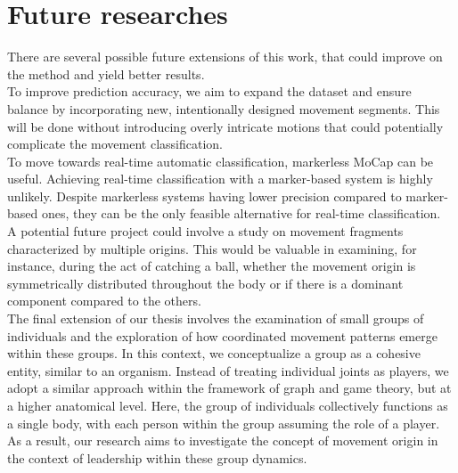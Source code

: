 \section{Future researches}
\label{sec:future_researches}
There are several possible future extensions of this work, that could improve on the method
and yield better results. \\

To improve prediction accuracy, we aim to expand the dataset and ensure balance by incorporating new, intentionally designed movement segments.
This will be done without introducing overly intricate motions that could potentially complicate the movement classification.
\\
To move towards real-time automatic classification, markerless MoCap can be useful.
Achieving real-time classification with a marker-based system is highly unlikely.
Despite markerless systems having lower precision compared to marker-based ones, they can be the only feasible alternative for real-time classification.
\\
A potential future project could involve a study on movement fragments characterized by multiple origins.
This would be valuable in examining, for instance, during the act of catching a ball, whether the movement origin is symmetrically distributed throughout the body or if there is a dominant component compared to the others.
\\
The final extension of our thesis involves the examination of small groups of individuals and the exploration of how coordinated movement patterns emerge within these groups.
In this context, we conceptualize a group as a cohesive entity, similar to an organism.
Instead of treating individual joints as players, we adopt a similar approach within the framework of graph and game theory, but at a higher anatomical level.
Here, the group of individuals collectively functions as a single body, with each person within the group assuming the role of a player.
As a result, our research aims to investigate the concept of movement origin in the context of leadership within these group dynamics.